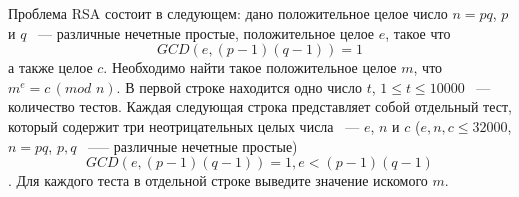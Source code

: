 Проблема RSA состоит в следующем:
дано положительное целое число $n = pq$, $p$ и $q$ ~---
различные нечетные простые,
положительное целое $e$, такое что $$GCD(e, (p-1)(q-1)) = 1$$
а также целое $c$. Необходимо найти такое положительное целое $m$,
что $m^e = c \, (mod \,\,n)$.
\InputFile
В первой строке находится одно число $t$,
$1 \le t \le 10000$ ~--- количество тестов.
Каждая следующая строка представляет собой отдельный тест,
который содержит три неотрицательных целых числа ~--- $e$, $n$ и $c$
($e, n, c \le 32000$, $n = pq$, $p, q$ ~--— различные нечетные простые)
$$GCD(e, (p-1)(q-1)) = 1, e < (p-1)(q-1)$$.
\OutputFile
Для каждого теста в отдельной строке выведите значение искомого $m$.

